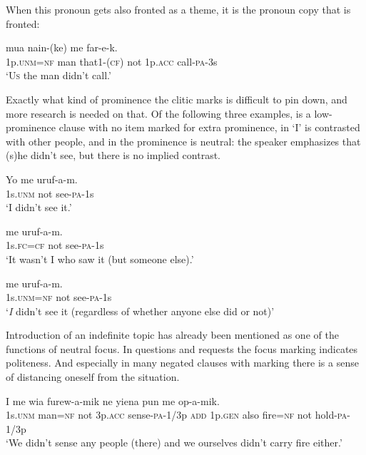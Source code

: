 When this pronoun gets also fronted as a theme, it is the pronoun copy that is fronted:

\ea%
\label{ex:x1744}
\gll {}  mua  nain-(ke)  me    far-e-k. \\
1p.\textsc{unm}=\textsc{nf}  man  that1-(\textsc{cf})  not  1p.\textsc{acc}  call-\textsc{pa}-3s      \\
\glt`\textsc{\textsc{Us}}  the man didn't call.'
\z


Exactly what kind of prominence the  clitic marks is difficult to pin down, and more research is needed on that. Of the following three examples,  is a low-prominence clause with no item marked for extra prominence, in  `I' is contrasted with other people, and in  the prominence is neutral: the speaker emphasizes that (s)he didn't see, but there is no implied contrast. 

\ea%
\label{ex:x1734}
\gll Yo  me  uruf-a-m. \\
1s.\textsc{unm}  not  see-\textsc{pa}-1s      \\
\glt`I didn't see it.'
\z


\ea%
\label{ex:x1735}
\gll {}  me  uruf-a-m. \\
1s.\textsc{fc}=\textsc{cf}  not  see-\textsc{pa}-1s      \\
\glt`It wasn't I who saw it (but someone else).'
\z


\ea%
\label{ex:x1736}
\gll {}  me  uruf-a-m. \\
1s.\textsc{unm}=\textsc{nf}  not  see-\textsc{pa}-1s      \\
\glt`\textit{I}  didn't see it (regardless of whether anyone else did or not)'
\z


Introduction of an indefinite topic has already been mentioned as one of the functions of neutral focus. In questions and requests the focus marking indicates politeness. And especially in many negated clauses with  marking there is a sense of distancing oneself from the situation. 

\ea%
\label{ex:x1738}
\gll I    me  wia  furew-a-mik  ne  yiena  pun   me  op-a-mik. \\
1s.\textsc{unm}  man=\textsc{nf}  not  3p.\textsc{acc}  sense-\textsc{pa}-1/3p  \textsc{add}  1p.\textsc{gen}  also fire=\textsc{nf}  not  hold-\textsc{pa}-1/3p     \\
\glt`We didn't sense any people (there) and we ourselves didn't carry fire either.'
\z


